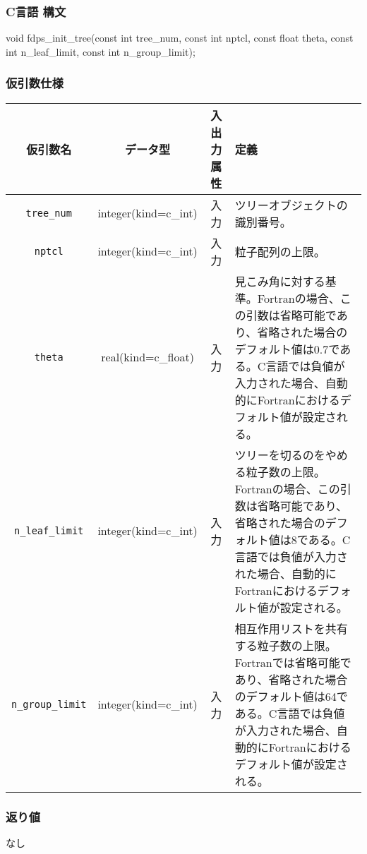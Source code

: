 \subsubsection*{C言語 構文}
\begin{screen}
\begin{spverbatim}
void fdps_init_tree(const int tree_num,
                    const int nptcl,
                    const float theta,
                    const int n_leaf_limit,
                    const int n_group_limit);
\end{spverbatim}
\end{screen}

\clearpage

\subsubsection*{仮引数仕様}
\begin{table}[h]
\begin{tabularx}{\linewidth}{cccX}
\toprule
\rowcolor{Snow2}
仮引数名 & データ型 & 入出力属性 & 定義 \\
\midrule
\verb|tree_num|      & integer(kind=c\_int) & 入力 & ツリーオブジェクトの識別番号。\\
\verb|nptcl|         & integer(kind=c\_int) & 入力 & 粒子配列の上限。\\
\verb|theta|         & real(kind=c\_float)  & 入力 & 見こみ角に対する基準。Fortranの場合、この引数は省略可能であり、省略された場合のデフォルト値は0.7である。C言語では負値が入力された場合、自動的にFortranにおけるデフォルト値が設定される。\\
\verb|n_leaf_limit|  & integer(kind=c\_int) & 入力 & ツリーを切るのをやめる粒子数の上限。Fortranの場合、この引数は省略可能であり、省略された場合のデフォルト値は8である。C言語では負値が入力された場合、自動的にFortranにおけるデフォルト値が設定される。 \\ 
\verb|n_group_limit| & integer(kind=c\_int) & 入力 & 相互作用リストを共有する粒子数の上限。Fortranでは省略可能であり、省略された場合のデフォルト値は64である。C言語では負値が入力された場合、自動的にFortranにおけるデフォルト値が設定される。\\ 
\bottomrule
\end{tabularx}
\end{table}

\subsubsection*{返り値}
なし

